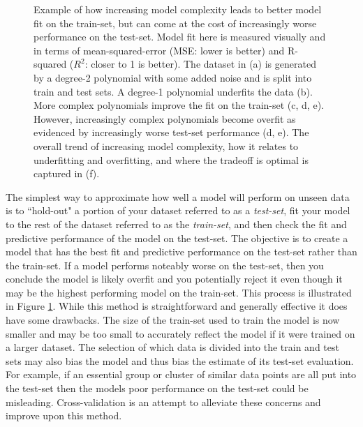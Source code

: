 \begin{figure}
	\caption{Example of how increasing model complexity leads to better model fit on the train-set, but can come at the cost of increasingly worse performance on the test-set. Model fit here is measured visually and in terms of mean-squared-error (MSE: lower is better) and R-squared ($R^2$: closer to 1 is better). The dataset in (a) is generated by a degree-2 polynomial with some added noise and is split into train and test sets. A degree-1 polynomial underfits the data (b). More complex polynomials improve the fit on the train-set (c, d, e). However, increasingly complex polynomials become overfit as evidenced by increasingly worse test-set performance (d, e). The overall trend of increasing model complexity, how it relates to underfitting and overfitting, and where the tradeoff is optimal is captured in (f).}
	\label{fig:overfitting_example}
\end{figure}

The simplest way to approximate how well a model will perform on unseen data is to ``hold-out" a portion of your dataset referred to as a \textit{test-set}, fit your model to the rest of the dataset referred to as the \textit{train-set}, and then check the fit and predictive performance of the model on the test-set. The objective is to create a model that has the best fit and predictive performance on the test-set rather than the train-set. If a model performs noteably worse on the test-set, then you conclude the model is likely overfit and you potentially reject it even though it may be the highest performing model on the train-set. This process is illustrated in Figure \ref{fig:overfitting_example}.  While this method is straightforward and generally effective it does have some drawbacks. The size of the train-set used to train the model is now smaller and may be too small to accurately reflect the model if it were trained on a larger dataset. The selection of which data is divided into the train and test sets may also bias the model and thus bias the estimate of its test-set evaluation. For example, if an essential group or cluster of similar data points are all put into the test-set then the models poor performance on the test-set could be misleading. Cross-validation is an attempt to alleviate these concerns and improve upon this method.

